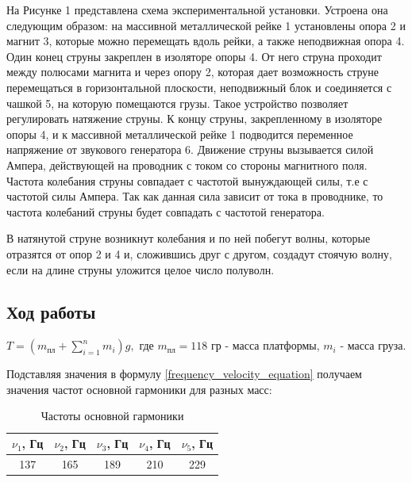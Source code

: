 \documentclass[a4paper, 12pt]{article}
\begin{document}
        На Рисунке 1 представлена схема экспериментальной установки. Устроена она следующим образом: на массивной металлической рейке 1 установлены опора 2 и магнит 3, которые можно перемещать вдоль рейки, а также неподвижная опора 4. Один конец струны закреплен в изоляторе опоры 4. От него струна проходит между полюсами магнита и через опору 2, которая дает возможность струне перемещаться в горизонтальной плоскости, неподвижный блок и соединяется с чашкой 5, на которую помещаются грузы. Такое устройство позволяет регулировать натяжение струны. К концу струны, закрепленному в изоляторе опоры 4, и к массивной металлической рейке 1 подводится переменное напряжение от звукового генератора 6. Движение струны вызывается силой Ампера, действующей на проводник с током со стороны магнитного поля. Частота колебания струны совпадает с частотой вынуждающей силы, т.е с частотой силы Ампера. Так как данная сила зависит от тока в проводнике, то частота колебаний струны будет совпадать с частотой генератора.
	
	В натянутой струне возникнут колебания и по ней побегут волны, которые отразятся от опор 2 и 4 и, сложившись друг с другом, создадут стоячую волну, если на длине струны уложится целое число полуволн.

    \begin{center}
        \section*{Ход работы}
        $T = (m_\text{пл} + \sum\limits_{i=1}^n m_i)g,$ 
        где $m_\text{пл} = 118$ гр - масса платформы, $m_i$ - масса груза.
        
        \bigskip
        
        Подставляя значения в формулу \eqref{frequency_velocity_equation} получаем значения частот основной гармоники для разных масс:
    \end{center}

    \begin{table}[!h]
        \begin{center}
		\begin{tabular}{|c|c|c|c|c|}
			\hline
			$\nu_1$, Гц &$\nu_2$, Гц& $\nu_3$, Гц& $\nu_4$, Гц& $\nu_5$, Гц\\
			\hline
			137 & 165 & 189 & 210 & 229\\
			\hline 
		\end{tabular}
  
	    \caption{Частоты основной гармоники}
        \end{center}
    \end{table}
\end{document}
